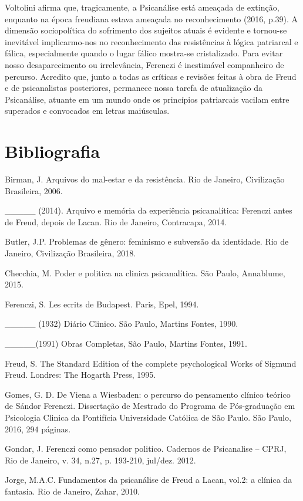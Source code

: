 Voltolini afirma que, tragicamente, a Psicanálise está ameaçada de
extinção, enquanto na época freudiana estava ameaçada no reconhecimento
(2016, p.39). A dimensão sociopolítica do sofrimento dos sujeitos atuais
é evidente e tornou-se inevitável implicarmo-nos no reconhecimento das
resistências à lógica patriarcal e fálica, especialmente quando o lugar
fálico mostra-se cristalizado. Para evitar nosso desaparecimento ou
irrelevância, Ferenczi é inestimável companheiro de percurso. Acredito
que, junto a todas as críticas e revisões feitas à obra de Freud e de
psicanalistas posteriores, permanece nossa tarefa de atualização da
Psicanálise, atuante em um mundo onde os princípios patriarcais vacilam
entre superados e convocados em letras maiúsculas.

\section{Bibliografia}

Birman, J. Arquivos do mal-estar e da resistência. Rio de Janeiro,
Civilização Brasileira, 2006.

\_\_\_\_\_ (2014). Arquivo e memória da experiência psicanalítica:
Ferenczi antes de Freud, depois de Lacan. Rio de Janeiro, Contracapa,
2014.

Butler, J.P. Problemas de gênero: feminismo e subversão da identidade.
Rio de Janeiro, Civilização Brasileira, 2018.

Checchia, M. Poder e politica na clinica psicanalítica. São Paulo,
Annablume, 2015.

Ferenczi, S. Les ecrits de Budapest. Paris, Epel, 1994.

\_\_\_\_\_ (1932) Diário Clinico. São Paulo, Martins Fontes, 1990.

\_\_\_\_\_(1991) Obras Completas, São Paulo, Martins Fontes, 1991.

Freud, S. The Standard Edition of the complete psychological Works of
Sigmund Freud. Londres: The Hogarth Press, 1995.

Gomes, G. D. De Viena a Wiesbaden: o percurso do pensamento clínico
teórico de Sándor Ferenczi. Dissertação de Mestrado do Programa de
Pós-graduação em Psicologia Clinica da Pontifícia Universidade Católica
de São Paulo. São Paulo, 2016, 294 páginas.

Gondar, J. Ferenczi como pensador politico. Cadernos de Psicanalise --
CPRJ, Rio de Janeiro, v. 34, n.27, p. 193-210, jul/dez. 2012.

Jorge, M.A.C. Fundamentos da psicanálise de Freud a Lacan, vol.2: a
clínica da fantasia. Rio de Janeiro, Zahar, 2010.

